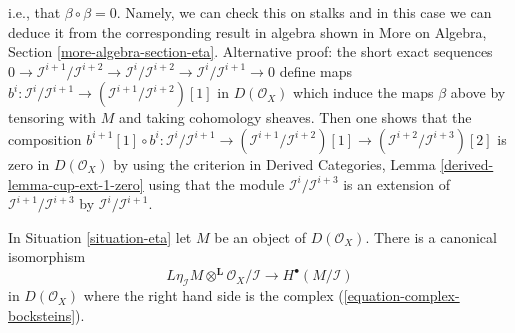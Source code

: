 i.e., that $\beta \circ \beta = 0$. Namely, we can check this on stalks
and in this case we can deduce it from the corresponding result in algebra
shown in More on Algebra, Section \ref{more-algebra-section-eta}.
Alternative proof: the short exact sequences
$0 \to \mathcal{I}^{i + 1}/\mathcal{I}^{i + 2}
\to \mathcal{I}^i/\mathcal{I}^{i + 2}
\to \mathcal{I}^i/\mathcal{I}^{i + 1} \to 0$
define maps
$b^i : \mathcal{I}^i/\mathcal{I}^{i + 1} \to
(\mathcal{I}^{i + 1}/\mathcal{I}^{i + 2})[1]$
in $D(\mathcal{O}_X)$
which induce the maps $\beta$ above by tensoring with $M$
and taking cohomology sheaves.
Then one shows that the composition
$b^{i + 1}[1] \circ b^i : \mathcal{I}^i/\mathcal{I}^{i + 1} \to
(\mathcal{I}^{i + 1}/\mathcal{I}^{i + 2})[1] \to
(\mathcal{I}^{i + 2}/\mathcal{I}^{i + 3})[2]$
is zero in $D(\mathcal{O}_X)$ by using the criterion in
Derived Categories, Lemma \ref{derived-lemma-cup-ext-1-zero}
using that the module $\mathcal{I}^i/\mathcal{I}^{i + 3}$
is an extension of $\mathcal{I}^{i + 1}/\mathcal{I}^{i + 3}$
by $\mathcal{I}^i/\mathcal{I}^{i + 1}$.

\begin{lemma}
\label{lemma-eta-second-property}
In Situation \ref{situation-eta} let $M$ be an object of
$D(\mathcal{O}_X)$. There is a canonical isomorphism
$$
L\eta_\mathcal{I}M \otimes^\mathbf{L} \mathcal{O}_X/\mathcal{I}
\longrightarrow
H^\bullet(M/\mathcal{I})
$$
in $D(\mathcal{O}_X)$ where the right hand side is the complex
(\ref{equation-complex-bocksteins}).
\end{lemma}

